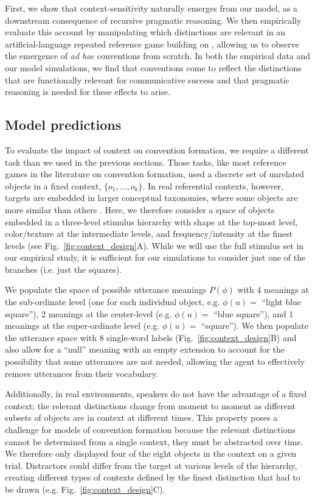 First, we show that context-sensitivity naturally emerges from our model, as a downstream consequence of recursive pragmatic reasoning.
We then empirically evaluate this account by manipulating which distinctions are relevant in an artificial-language repeated reference game building on , allowing us to observe the emergence of \emph{ad hoc} conventions from scratch.
In both the empirical data and our model simulations, we find that conventions come to reflect the distinctions that are functionally relevant for communicative success and that pragmatic reasoning is needed for these effects to arise. 


\subsection{Model predictions}

To evaluate the impact of context on convention formation, we require a different task than we used in the previous sections.
Those tasks, like most reference games in the literature on convention formation, used a discrete set of unrelated objects in a fixed context, $\{o_1, \dots, o_k\}$. 
In real referential contexts, however, targets are embedded in larger conceptual taxonomies, where some objects are more similar than others \cite{bruner1956study,collins1969retrieval,XuTenenbaum07_WordLearningBayesian}.
Here, we therefore consider a space of objects embedded in a three-level stimulus hierarchy with shape at the top-most level, color/texture at the intermediate levels, and frequency/intensity at the finest levels (see Fig.~\ref{fig:context_design}A). 
While we will use the full stimulus set in our empirical study, it is sufficient for our simulations to consider just one of the branches (i.e. just the squares).

We populate the space of possible utterance meanings $P(\phi)$ with 4 meanings at the sub-ordinate level (one for each individual object, e.g. $\phi(u) =$ ``light blue square''), 2 meanings at the center-level (e.g. $\phi(u) =$ ``blue square''), and 1 meanings at the super-ordinate level (e.g. $\phi(u) =$ ``square'').
We then populate the utterance space with 8 single-word labels (Fig.~\ref{fig:context_design}B) and also allow for a ``null'' meaning with an empty extension to account for the possibility that some utterances are not needed, allowing the agent to effectively remove utterances from their vocabulary.

Additionally, in real environments, speakers do not have the advantage of a fixed context; the relevant distinctions change from moment to moment as different subsets of objects are in context at different times. 
This property poses a challenge for models of convention formation because the relevant distinctions cannot be determined from a single context, they must be abstracted over time.
We therefore only displayed four of the eight objects in the context on a given trial.
Distractors could differ from the target at various levels of the hierarchy, creating different types of contexts defined by the finest distinction that had to be drawn (e.g. Fig.~\ref{fig:context_design}C).  

